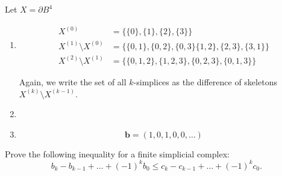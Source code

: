 \documentclass[12 pt, letterpaper]{hmcpset}
\begin{document}
\begin{solution}
	Let $X = \partial B^{4}$
	\begin{enumerate}
		\item
			\[
				\boxed{
					\begin{split}
						X^{(0)} & = \{ \{ 0 \},  \{ 1 \}, \{ 2 \}, \{ 3 \} \} \\
						X^{(1)} \setminus X^{(0)} & = \{ \{ 0, 1 \}, \{ 0, 2 \}, \{ 0, 3 \} \{ 1, 2 \}, \{ 2, 3 \}, \{ 3, 1 \} \} \\
						X^{(2)} \setminus X^{(1)} & = \{ \{ 0, 1, 2 \}, \{ 1, 2, 3 \}, \{ 0, 2, 3 \},  \{ 0, 1, 3 \} \}
					\end{split}
				}
			\]

			Again, we write the set of all $k$-simplices as the difference of skeletons $X^{(k)} \setminus X^{(k - 1)}$.

		\item

		\item
			\[
				\boxed{
					\mathbf{b} = (1, 0, 1, 0, 0, \dots)
				}
			\]
	\end{enumerate}
\end{solution}

\pagebreak

\begin{problem}
	Prove the following inequality for a finite simplicial complex:
	\[
		b_{k} - b_{k - 1} + \dots + (-1)^{k} b_{0} \le c_{k} - c_{k - 1} + \dots + (-1)^{k} c_{0}.
	\]
\end{problem}
\end{document}
